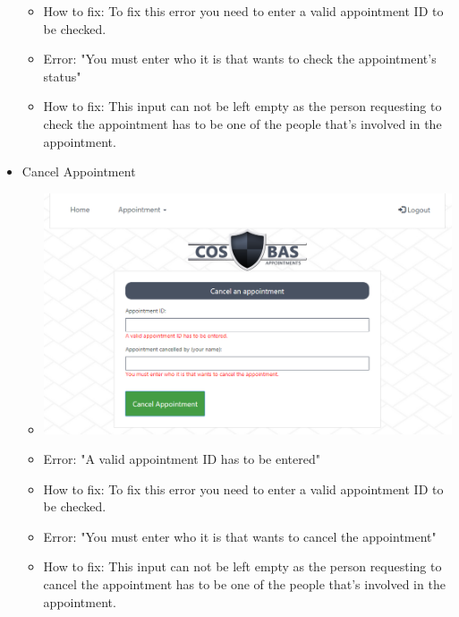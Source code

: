 \begin{itemize}
\begin{itemize}
				\item How to fix: To fix this error you need to enter a valid appointment ID to be checked. 
				\item Error: "You must enter who it is that wants to check the appointment's status"
				\item How to fix: This input can not be left empty as the person requesting to check the appointment has to be one of the people that's involved in the appointment.
			\end{itemize}
		\item Cancel Appointment
			\begin{itemize}
				\item \includegraphics[width=\linewidth]{images/Screenshots/CancelAppoint_Error.png}
				\item Error: "A valid appointment ID has to be entered"
				\item How to fix: To fix this error you need to enter a valid appointment ID to be checked. 
				\item Error: "You must enter who it is that wants to cancel the appointment"
				\item How to fix: This input can not be left empty as the person requesting to cancel the appointment has to be one of the people that's involved in the appointment.
			\end{itemize}
	\end{itemize}